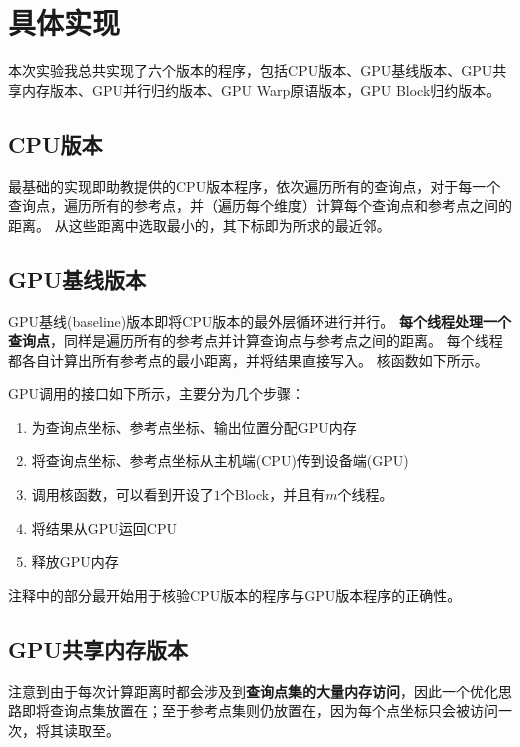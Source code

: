 \documentclass[logo,reportComp]{thesis}
\def\globalmem{\textcolor{black}{\kaiti 全局内存}}
\def\sharedmem{\textcolor{red}{\kaiti 共享内存}}
\begin{document}
\section{具体实现}
\label{sec:imp}
本次实验我总共实现了六个版本的程序，包括CPU版本、GPU基线版本、GPU共享内存版本、GPU并行归约版本、GPU Warp原语版本，GPU Block归约版本。

\subsection{CPU版本}
最基础的实现即助教提供的CPU版本程序，依次遍历所有的查询点，对于每一个查询点，遍历所有的参考点，并（遍历每个维度）计算每个查询点和参考点之间的距离。
从这些距离中选取最小的，其下标即为所求的最近邻。



\subsection{GPU基线版本}
GPU基线(baseline)版本即将CPU版本的最外层循环进行并行。
\textbf{每个线程处理一个查询点}，同样是遍历所有的参考点并计算查询点与参考点之间的距离。
每个线程都各自计算出所有参考点的最小距离，并将结果直接写入。
核函数如下所示。


GPU调用的接口如下所示，主要分为几个步骤：
\begin{enumerate}
	\item 为查询点坐标、参考点坐标、输出位置分配GPU内存
	\item 将查询点坐标、参考点坐标从主机端(CPU)传到设备端(GPU)
	\item 调用核函数，可以看到开设了$1$个Block，并且有$m$个线程。
	\item 将结果从GPU运回CPU
	\item 释放GPU内存
\end{enumerate}


注释中的部分最开始用于核验CPU版本的程序与GPU版本程序的正确性。

\subsection{GPU共享内存版本}
注意到由于每次计算距离时都会涉及到\textbf{查询点集的大量内存访问}，因此一个优化思路即将查询点集放置在；至于参考点集则仍放置在，因为每个点坐标只会被访问一次，将其读取至。
\end{document}
